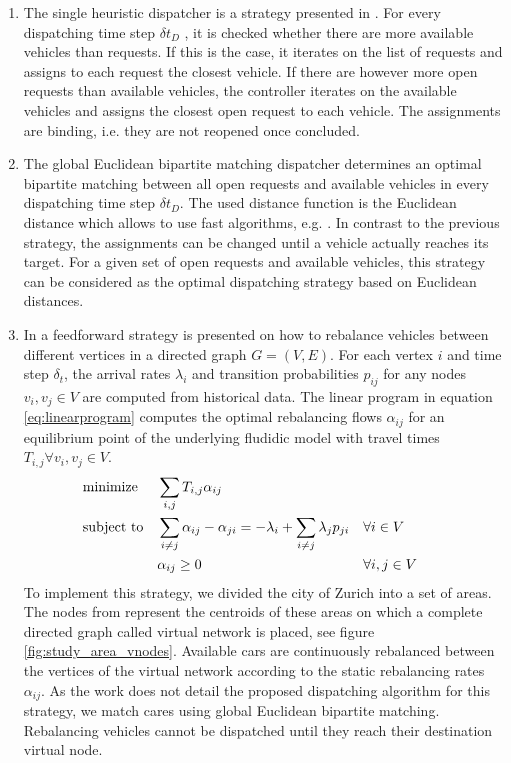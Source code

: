 \begin{enumerate}
\item The single heuristic dispatcher is a strategy presented in \cite{bischoff2016simulation}. For every dispatching time step $\delta t_D$ , it is checked whether there are more available vehicles than requests. If this is the case, it iterates on the list of requests and assigns to each request the closest vehicle. If there are however more open requests than available vehicles, the controller iterates on the available vehicles and assigns the closest open request to each vehicle. The assignments are binding, i.e. they are not reopened once concluded.
\item The global Euclidean bipartite matching dispatcher determines an optimal bipartite matching between all open requests and available vehicles in every dispatching time step $\delta t_D$. The used distance function is the Euclidean distance which allows to use fast algorithms, e.g. \cite{agarwal2004near}. In contrast to the previous strategy, the assignments can be changed until a vehicle actually reaches its target. For a given set of open requests and available vehicles, this strategy can be considered as the optimal dispatching strategy based on Euclidean distances.
\item In \cite{pavone2011load} a feedforward strategy is presented on how to rebalance vehicles between different vertices in a directed graph $G = (V,E)$. For each vertex $i$ and time step $\delta_t$, the arrival rates $\lambda_i$ and transition probabilities $p_{ij}$ for any nodes $v_i, v_j \in V$  are computed from historical data. The linear program in equation \ref{eq:linearprogram} computes the optimal rebalancing flows $\alpha _{ij}$ for an equilibrium point of the underlying fludidic model with travel times $T_{i,j} \forall v_i, v_j \in V$.  
\begin{align}
&\textnormal{minimize}& &\sum_{i,j} T_{i,j} \alpha _{ij} & && && \nonumber \\
&\textnormal{subject to}& 
&\sum_{i \neq j} \alpha _{ij} - \alpha _{ji} =-\lambda_i  + \sum_{i \neq j} \lambda_j p_{ji} 
& &\forall i \in V &\label{eq:linearprogram} \\
&& &\alpha_{ij} \geq 0& & \forall i, j \in V& \nonumber
\end{align}
To implement this strategy, we divided the city of Zurich into a set of areas. The nodes from \cite{pavone2011load} represent the centroids of these areas on which a complete directed graph called virtual network is placed, see figure \ref{fig:study_area_vnodes}. Available cars are continuously rebalanced between the vertices of the virtual network according to the static rebalancing rates $\alpha_{ij}$. As the work does not detail the proposed dispatching algorithm for this strategy, we match cares using global Euclidean bipartite matching. Rebalancing vehicles cannot be dispatched until they reach their destination virtual node.

\end{enumerate}
